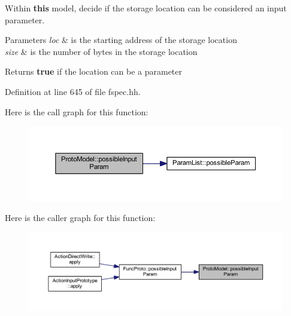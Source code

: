 Within {\bfseries{this}} model, decide if the storage location can be considered an input parameter. 
\begin{DoxyParams}{Parameters}
{\em loc} & is the starting address of the storage location \\
\hline
{\em size} & is the number of bytes in the storage location \\
\hline
\end{DoxyParams}
\begin{DoxyReturn}{Returns}
{\bfseries{true}} if the location can be a parameter 
\end{DoxyReturn}


Definition at line 645 of file fspec.\+hh.

Here is the call graph for this function\+:
\nopagebreak
\begin{figure}[H]
\begin{center}
\leavevmode
\includegraphics[width=350pt]{class_proto_model_a1c0e6fe360413702b20cd04367dc477f_cgraph}
\end{center}
\end{figure}
Here is the caller graph for this function\+:
\nopagebreak
\begin{figure}[H]
\begin{center}
\leavevmode
\includegraphics[width=350pt]{class_proto_model_a1c0e6fe360413702b20cd04367dc477f_icgraph}
\end{center}
\end{figure}
\mbox{\label{class_proto_model_a6577cdf023ed6a660ba804e43e356b4e}} 

